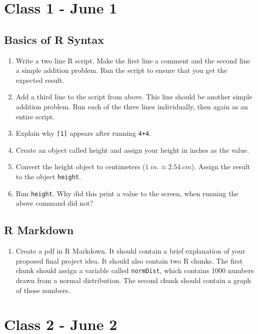 \documentclass[letterpaper,12pt]{article}
\begin{document}
\section{Class 1 - June 1}

\subsection{Basics of R Syntax}

\begin{enumerate}
    \item Write a two line R script. 
    Make the first line a comment and the second line a simple addition problem. 
    Run the script to ensure that you get the expected result.
    \item Add a third line to the script from above. 
    This line should be another simple addition problem. 
    Run each of the three lines individually, then again as an entire script. 
    \item Explain why \verb|[1]| appears after running \verb|4+4|.
    \item Create an object called height and assign your height in inches as the value. 
    \item Convert the height object to centimeters ($1 \: in. \approx 2.54 \: cm$). 
    Assign the result to the object \verb|height|.
    \item Run \verb|height|. 
    Why did this print a value to the screen, when running the above command did not?
\end{enumerate}

\subsection{R Markdown}

\begin{enumerate}
    \item Create a pdf in R Markdown. 
    It should contain a brief explanation of your proposed final project idea. 
    It should also contain two R chunks. 
    The first chunk should assign a variable called \verb|normDist|, which contains 1000 numbers drawn from a normal distribution. 
    The second chunk should contain a graph of those numbers. 
\end{enumerate}

\section{Class 2 - June 2}
\end{document}
